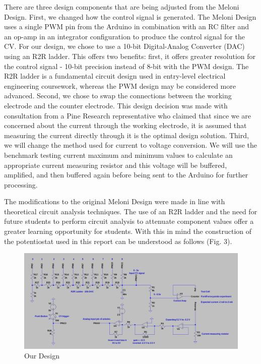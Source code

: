 \documentclass{article}
\begin{document}
There are three design components that are being adjusted from the Meloni Design. First, we changed how the control signal is generated. The Meloni Design uses a single PWM pin from the Arduino in combination with an RC filter and an op-amp in an integrator configuration to produce the control signal for the CV. For our design, we chose to use a 10-bit Digital-Analog Converter (DAC) using an R2R ladder. This offers two benefits: first, it offers greater resolution for the control signal - 10-bit precision instead of 8-bit with the PWM design. The R2R ladder is a fundamental circuit design used in entry-level electrical engineering coursework, whereas the PWM design may be considered more advanced. Second, we chose to swap the connections between the working electrode and the counter electrode. This design decision was made with consultation from a Pine Research representative who claimed that since we are concerned about the current through the working electrode, it is assumed that measuring the current directly through it is the optimal design solution. Third, we will change the method used for current to voltage conversion. We will use the benchmark testing current maximum and minimum values to calculate an appropriate current measuring resistor and this voltage will be buffered, amplified, and then buffered again before being sent to the Arduino for further processing.


The modifications to the original Meloni Design were made in line with theoretical circuit analysis techniques. The use of an R2R ladder and the need for future students to perform circuit analysis to attenuate component values offer a greater learning opportunity for students. With this in mind the construction of the potentiostat used in this report can be understood as follows (Fig. 3).


\begin{figure}[h]
\centering
\includegraphics[width=.9\linewidth]{diy_design.png}
\caption{Our Design}
\end{figure}
\end{document}
